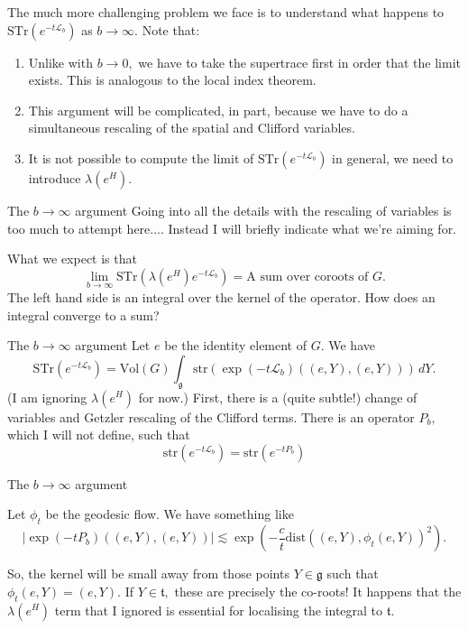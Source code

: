 \documentclass{beamer}
\numberwithin{equation}{section}
\theoremstyle{plain}
\theoremstyle{plain}
\theoremstyle{definition}
\theoremstyle{plain}
\theoremstyle{plain}
\theoremstyle{definition}
\newcommand{\Lc}{\mathcal{L}}
\newcommand{\gf}{\mathfrak{g}}
\newcommand{\tf}{\mathfrak{t}}
\newcommand{\Str}{\mathrm{STr}}
\begin{document}
\begin{frame}
  The much more challenging problem we face is to understand what happens to $\Str(e^{-t\Lc_b})$ as $b\to\infty.$
  Note that:
  \begin{enumerate}
    \item{} Unlike with $b\to 0,$ we have to take the supertrace first in order that the limit exists. This is analogous to the local index theorem.
    \item{} This argument will be complicated, in part, because we have to do a simultaneous rescaling of the spatial and Clifford variables.
    \item{} It is not possible to compute the limit of $\Str(e^{-t\Lc_b})$ in general, we need to introduce $\lambda(e^H).$
  \end{enumerate}
\end{frame}

\begin{frame}{The $b\to\infty$ argument}
  Going into all the details with the rescaling of variables is too much to attempt here.... Instead I will briefly indicate what we're aiming for.

  What we expect is that
  \[
    \lim_{b\to\infty}\Str(\lambda(e^H)e^{-t\Lc_{b}}) = \text{A sum over coroots of }G.
  \]
  The left hand side is an integral over the kernel of the operator. How does an integral converge to a sum?
\end{frame}

\begin{frame}{The $b\to\infty$ argument}
  Let $e$ be the identity element of $G.$ We have
  \[
      \Str(e^{-t\Lc_b}) = \mathrm{Vol}(G)\int_{\gf} \mathrm{str}(\exp(-t\Lc_{b})((e,Y),(e,Y)))\,dY.
  \]
  (I am ignoring $\lambda(e^H)$ for now.)
  First, there is a (quite subtle!) change of variables and Getzler rescaling of the Clifford terms. There is an operator $P_{b},$ which I will not define, such that
  \[
      \mathrm{str}(e^{-t\Lc_b}) = \mathrm{str}(e^{-tP_{b}})
  \]
\end{frame}

\begin{frame}{The $b\to\infty$ argument}
  \begin{theorem}[(approximate)]
    Let $\phi_t$ be the geodesic flow. We have something like
    \[
      |\exp(-tP_{b})((e,Y),(e,Y))| \lesssim \exp(-\frac{c}{t}\mathrm{dist}((e,Y),\phi_t(e,Y))^2).
    \]
  \end{theorem}
  So, the kernel will be small away from those points $Y\in \gf$ such that $\phi_t(e,Y) =(e,Y).$
  \pause
  If $Y \in \tf,$ these are precisely the co-roots!\pause
  It happens that the $\lambda(e^H)$ term that I ignored is essential for localising the integral to $\tf.$
\end{frame}
\end{document}
